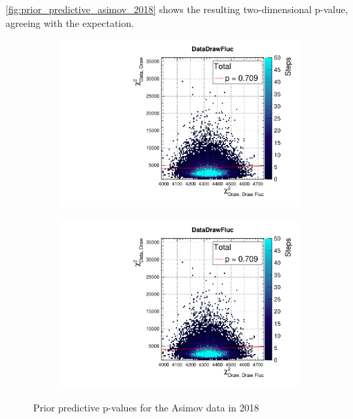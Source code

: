 \autoref{fig:prior_predictive_asimov_2018} shows the resulting two-dimensional p-value, agreeing with the expectation.
\begin{figure}[h]
	\begin{subfigure}[t]{0.49\textwidth}
		\includegraphics[width=\textwidth, trim={0mm 0mm 0mm 11mm}, clip,page=1]{figures/mach3/2018/asimov/pred/17May_MultiPi_CovFix_Final_pospred_PriorPred_procs.pdf}
	\end{subfigure}
	\begin{subfigure}[t]{0.49\textwidth}
		\includegraphics[width=\textwidth, trim={0mm 0mm 0mm 11mm}, clip,page=2]{figures/mach3/2018/asimov/pred/17May_MultiPi_CovFix_Final_pospred_PriorPred_procs.pdf}
	\end{subfigure}
	\caption{Prior predictive p-values for the Asimov data in 2018}
	\label{fig:prior_predictive_asimov_2018}
\end{figure}

